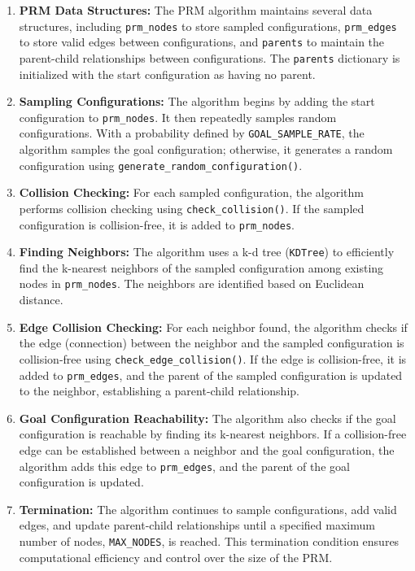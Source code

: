 \documentclass{article}
\begin{document}
\begin{enumerate}
    \item \textbf{PRM Data Structures:} The PRM algorithm maintains several data structures, including \texttt{prm\_nodes} to store sampled configurations, \texttt{prm\_edges} to store valid edges between configurations, and \texttt{parents} to maintain the parent-child relationships between configurations. The \texttt{parents} dictionary is initialized with the start configuration as having no parent.

    \item \textbf{Sampling Configurations:} The algorithm begins by adding the start configuration to \texttt{prm\_nodes}. It then repeatedly samples random configurations. With a probability defined by \texttt{GOAL\_SAMPLE\_RATE}, the algorithm samples the goal configuration; otherwise, it generates a random configuration using \texttt{generate\_random\_configuration()}.

    \item \textbf{Collision Checking:} For each sampled configuration, the algorithm performs collision checking using \texttt{check\_collision()}. If the sampled configuration is collision-free, it is added to \texttt{prm\_nodes}.

    \item \textbf{Finding Neighbors:} The algorithm uses a k-d tree (\texttt{KDTree}) to efficiently find the k-nearest neighbors of the sampled configuration among existing nodes in \texttt{prm\_nodes}. The neighbors are identified based on Euclidean distance.

    \item \textbf{Edge Collision Checking:} For each neighbor found, the algorithm checks if the edge (connection) between the neighbor and the sampled configuration is collision-free using \texttt{check\_edge\_collision()}. If the edge is collision-free, it is added to \texttt{prm\_edges}, and the parent of the sampled configuration is updated to the neighbor, establishing a parent-child relationship.

    \item \textbf{Goal Configuration Reachability:} The algorithm also checks if the goal configuration is reachable by finding its k-nearest neighbors. If a collision-free edge can be established between a neighbor and the goal configuration, the algorithm adds this edge to \texttt{prm\_edges}, and the parent of the goal configuration is updated.

    \item \textbf{Termination:} The algorithm continues to sample configurations, add valid edges, and update parent-child relationships until a specified maximum number of nodes, \texttt{MAX\_NODES}, is reached. This termination condition ensures computational efficiency and control over the size of the PRM.

\end{enumerate}
\end{document}

